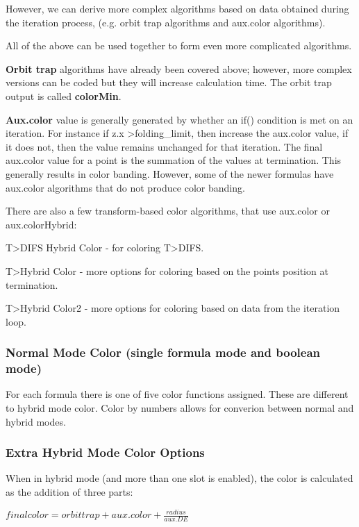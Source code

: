However, we can derive more complex algorithms based on data obtained during the iteration process, (e.g. orbit trap algorithms and aux.color algorithms).

All of the above can be used together to form even more complicated algorithms.

\textbf{Orbit trap} algorithms have already been covered above; however, more complex versions can be coded but they will increase calculation time. The orbit trap output is called \textbf{colorMin}.

\textbf{Aux.color} value is generally generated by whether an if() condition is met on an iteration. For instance if z.x \textgreater\space folding\_limit, then increase the aux.color value, if it does not, then the value remains unchanged for that iteration. The final aux.color value for a point is the summation of the values at termination. This generally results in color banding. However, some of the newer formulas have aux.color algorithms that do not produce color banding.

There are also a few transform-based color algorithms, that use aux.color or aux.colorHybrid:

T>DIFS Hybrid Color - for coloring T>DIFS.

T>Hybrid Color - more options for coloring based on the points position at termination.

T>Hybrid Color2 - more options for coloring based on data from the iteration loop.

\subsubsection{Normal Mode Color (single formula mode and boolean mode)}\label{materials-normal-mode-color}

For each formula there is one of five color functions assigned.
These are different to hybrid mode color. Color by numbers allows for converion between normal and hybrid modes.


\subsubsection{Extra Hybrid Mode Color Options}\label{materials-extra-hybrid-mode-color-options}

When in hybrid mode (and more than one slot is enabled), the color is calculated as the addition of three parts:

\(final color = orbit trap  +  aux.color  +  \frac{radius}{aux.DE}\)

